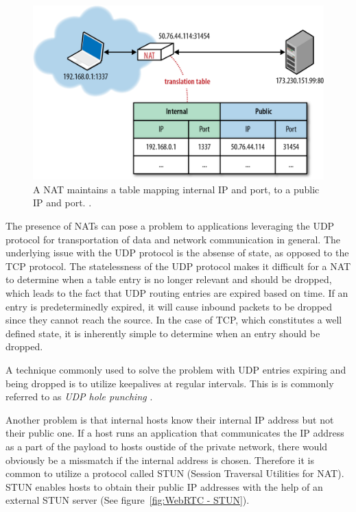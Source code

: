 \begin{figure}[htp]
\centering
\includegraphics[width=\textwidth,height=0.2\paperheight,keepaspectratio
]{figures/nat}
\caption{A NAT maintains a table mapping internal IP and port, to a public IP and port. \cite{NATIllustration:Online}.}
\label{fig:NAT}
\end{figure}

The presence of NATs can pose a problem to applications leveraging the UDP protocol for transportation of data and network communication in general. The underlying issue with the UDP protocol is the absense of state, as opposed to the TCP protocol. The statelessness of the UDP protocol makes it difficult for a NAT to determine when a table entry is no longer relevant and should be dropped, which leads to the fact that UDP routing entries are expired based on time. If an entry is predeterminedly expired, it will cause inbound packets to be dropped since they cannot reach the source. In the case of TCP, which constitutes a well defined state, it is inherently simple to determine when an entry should be dropped.

A technique commonly used to solve the problem with UDP entries expiring and being dropped is to utilize keepalives at regular intervals. This is is commonly referred to as \emph{UDP hole punching} \cite{UDPHolePunching:Online}.

Another problem is that internal hosts know their internal IP address but not their public one. If a host runs an application that communicates the IP address as a part of the payload to hosts oustide of the private network, there would obviously be a missmatch if the internal address is chosen. Therefore it is common to utilize a protocol called STUN (Session Traversal Utilities for NAT)\cite{RFC5389:Online}. STUN enables hosts to obtain their public IP addresses with the help of an external STUN server (See figure~\ref{fig:WebRTC - STUN}).

